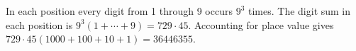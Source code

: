 In each position every digit from 1 through 9 occurs $9^3$ times. The digit sum in each position is $9^3(1+\cdots+9)=729\cdot 45$. Accounting for place value gives $729\cdot 45(1000+100+10+1)=\boxed{36446355}$.
